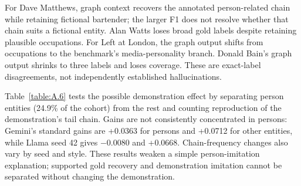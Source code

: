 For Dave Matthews, graph context recovers the annotated person-related chain while retaining fictional bartender; the larger F1 does not resolve whether that chain suits a fictional entity. Alan Watts loses broad gold labels despite retaining plausible occupations. For Left at London, the graph output shifts from occupations to the benchmark’s media-personality branch. Donald Bain’s graph output shrinks to three labels and loses coverage. These are exact-label disagreements, not independently established hallucinations.


Table~\ref{table:A.6} tests the possible demonstration effect by separating person entities (24.9\% of the cohort) from the rest and counting reproduction of the demonstration’s tail chain. Gains are not consistently concentrated in persons: Gemini’s standard gains are +0.0363 for persons and +0.0712 for other entities, while Llama seed 42 gives \ensuremath{-}0.0080 and +0.0668. Chain-frequency changes also vary by seed and style. These results weaken a simple person-imitation explanation; supported gold recovery and demonstration imitation cannot be separated without changing the demonstration.

